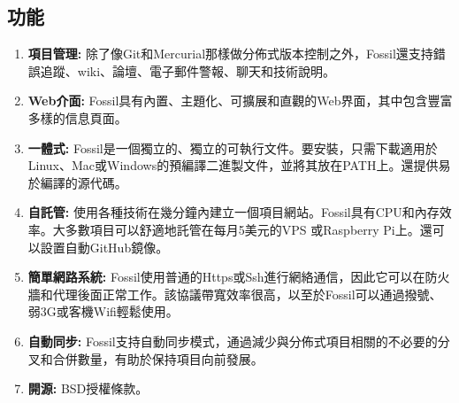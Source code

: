 \renewcommand{\baselinestretch}{20} %
\subsection{功能}
\par
\renewcommand{\baselinestretch}{1} %
\begin{enumerate}
	\item \textbf{項目管理:} 除了像Git和Mercurial那樣做分佈式版本控制之外，Fossil還支持錯誤追蹤、wiki、論壇、電子郵件警報、聊天和技術說明。
	\item \textbf{Web介面:} Fossil具有內置、主題化、可擴展和直觀的Web界面，其中包含豐富多樣的信息頁面。
	\item \textbf{一體式:} Fossil是一個獨立的、獨立的可執行文件。要安裝，只需下載適用於Linux、Mac或Windows的預編譯二進製文件，並將其放在PATH上。還提供易於編譯的源代碼。
	\item \textbf{自託管:} 使用各種技術在幾分鐘內建立一個項目網站。Fossil具有CPU和內存效率。大多數項目可以舒適地託管在每月5美元的VPS 或Raspberry Pi上。還可以設置自動GitHub鏡像。
	\item \textbf{簡單網路系統:} Fossil使用普通的Https或Ssh進行網絡通信，因此它可以在防火牆和代理後面正常工作。該協議帶寬效率很高，以至於Fossil可以通過撥號、弱3G或客機Wifi輕鬆使用。
	\item \textbf{自動同步:} Fossil支持自動同步模式，通過減少與分佈式項目相​​關的不必要的分叉和合併數量，有助於保持項目向前發展。
	\item \textbf{開源:} BSD授權條款。
\end{enumerate}
\par

\renewcommand{\baselinestretch}{20} %
